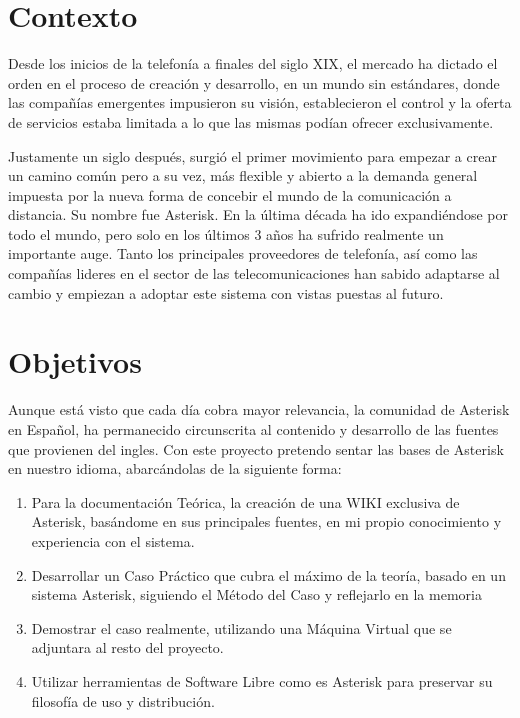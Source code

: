 
\section{Contexto}

Desde los inicios de la telefonía a finales del siglo XIX, el mercado ha dictado el orden en el proceso de creación y desarrollo, en un mundo sin estándares, donde las compañías emergentes impusieron su visión, establecieron el control y la oferta de servicios estaba limitada a lo que las mismas podían ofrecer exclusivamente.

Justamente un siglo después, surgió el primer movimiento para empezar a crear un camino común pero a su vez, más flexible y abierto a la demanda general impuesta por la nueva forma de concebir el mundo de la comunicación a distancia. Su nombre fue Asterisk. En la última década ha ido expandiéndose por todo el mundo, pero solo en los últimos 3 años ha sufrido realmente un importante auge. Tanto los principales proveedores de telefonía, así como las compañías lideres en el sector de las telecomunicaciones han sabido adaptarse al cambio y empiezan a adoptar este sistema con vistas puestas al futuro.

\section{Objetivos}

Aunque está visto que cada día cobra mayor relevancia, la comunidad de Asterisk en Español, ha permanecido circunscrita al contenido y desarrollo de las fuentes que provienen del ingles. Con este proyecto pretendo sentar las bases de Asterisk en nuestro idioma, abarcándolas de la siguiente forma:

\begin{enumerate}
	\item Para la documentación Teórica, la creación de una WIKI exclusiva de Asterisk, basándome en sus principales fuentes, en mi propio conocimiento y experiencia con el sistema.
	\item Desarrollar un Caso Práctico que cubra el máximo de la teoría, basado en un sistema Asterisk, siguiendo el Método del Caso y reflejarlo en la memoria
  \item Demostrar el caso realmente, utilizando una Máquina Virtual que se adjuntara al resto del proyecto.
  \item Utilizar herramientas de Software Libre como es Asterisk para preservar su filosofía de uso y distribución.
\end{enumerate}

